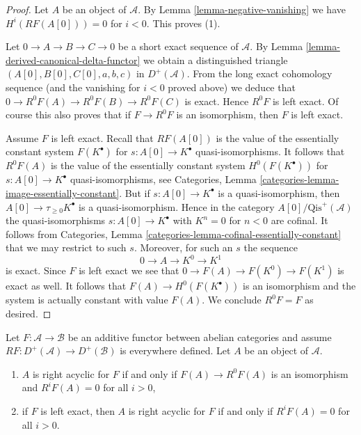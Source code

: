 \begin{proof}
Let $A$ be an object of $\mathcal{A}$. By Lemma \ref{lemma-negative-vanishing}
we have $H^i(RF(A[0])) = 0$ for $i < 0$. This proves (1).

\medskip\noindent
Let $0 \to A \to B \to C \to 0$ be a short exact sequence of $\mathcal{A}$.
By
Lemma \ref{lemma-derived-canonical-delta-functor}
we obtain a distinguished triangle
$(A[0], B[0], C[0], a, b, c)$ in $D^{+}(\mathcal{A})$.
From the long exact cohomology sequence (and the vanishing for $i < 0$
proved above) we deduce that $0 \to R^0F(A) \to R^0F(B) \to R^0F(C)$
is exact. Hence $R^0F$ is left exact. Of course this also proves that if
$F \to R^0F$ is an isomorphism, then $F$ is left exact.

\medskip\noindent
Assume $F$ is left exact. Recall that $RF(A[0])$ is the value of the
essentially constant system $F(K^\bullet)$ for $s : A[0] \to K^\bullet$
quasi-isomorphisms. It follows that $R^0F(A)$ is the value of the essentially
constant system $H^0(F(K^\bullet))$ for $s : A[0] \to K^\bullet$
quasi-isomorphisms, see Categories, Lemma
\ref{categories-lemma-image-essentially-constant}.
But if $s : A[0] \to K^\bullet$ is a quasi-isomorphism, then
$A[0] \to \tau_{\geq 0}K^\bullet$ is a quasi-isomorphism.
Hence in the category $A[0]/\text{Qis}^{+}(\mathcal{A})$ the
quasi-isomorphisms $s : A[0] \to K^\bullet$ with $K^n = 0$ for $n < 0$
are cofinal. It follows from
Categories, Lemma \ref{categories-lemma-cofinal-essentially-constant}
that we may restrict to such $s$.
Moreover, for such an $s$ the sequence
$$
0 \to A \to K^0 \to K^1
$$
is exact. Since $F$ is left exact we see that
$0 \to F(A) \to F(K^0) \to F(K^1)$ is exact as well.
It follows that $F(A) \to H^0(F(K^\bullet))$ is an isomorphism
and the system is actually constant with value $F(A)$.
We conclude $R^0F = F$ as desired.
\end{proof}

\begin{lemma}
\label{lemma-F-acyclic}
Let $F : \mathcal{A} \to \mathcal{B}$ be an additive functor
between abelian categories and assume
$RF : D^{+}(\mathcal{A}) \to D^{+}(\mathcal{B})$ is everywhere
defined. Let $A$ be an object of $\mathcal{A}$.
\begin{enumerate}
\item $A$ is right acyclic for $F$ if and only if
$F(A) \to R^0F(A)$ is an isomorphism and $R^iF(A) = 0$ for all $i > 0$,
\item if $F$ is left exact, then $A$ is right acyclic for $F$
if and only if $R^iF(A) = 0$ for all $i > 0$.
\end{enumerate}
\end{lemma}

